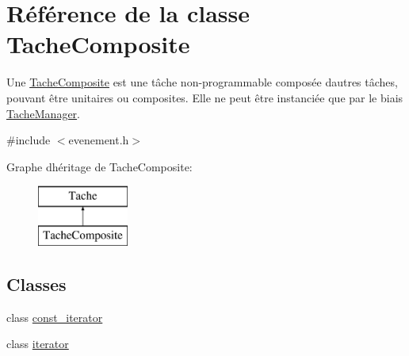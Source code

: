 \hypertarget{class_tache_composite}{}\section{Référence de la classe Tache\+Composite}
\label{class_tache_composite}


Une \hyperlink{class_tache_composite}{Tache\+Composite} est une tâche non-\/programmable composée d\textquotesingle{}autres tâches, pouvant être unitaires ou composites. Elle ne peut être instanciée que par le biais \hyperlink{class_tache_manager}{Tache\+Manager}.  




{\ttfamily \#include $<$evenement.\+h$>$}

Graphe d\textquotesingle{}héritage de Tache\+Composite\+:\begin{figure}[H]
\begin{center}
\leavevmode
\includegraphics[height=2.000000cm]{class_tache_composite}
\end{center}
\end{figure}
\subsection*{Classes}
\begin{DoxyCompactItemize}
\item 
class \hyperlink{class_tache_composite_1_1const__iterator}{const\+\_\+iterator}
\item 
class \hyperlink{class_tache_composite_1_1iterator}{iterator}
\end{DoxyCompactItemize}
